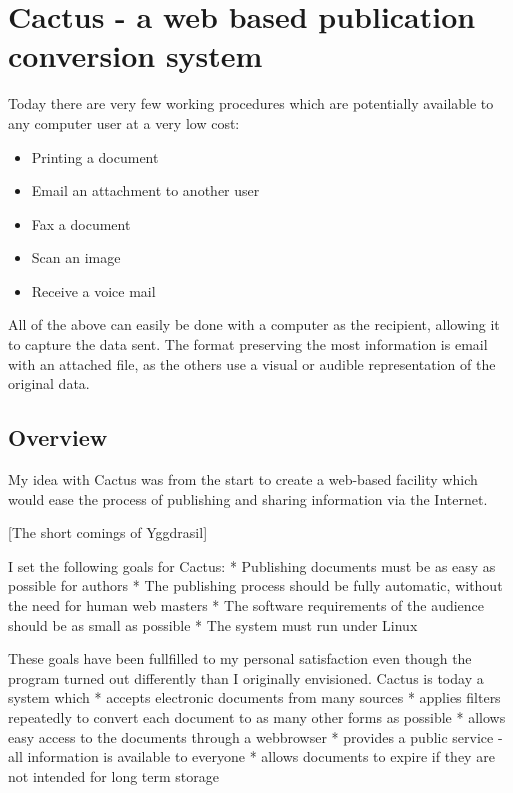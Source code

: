 



\chapter{Cactus - a web based publication conversion system}

\label{sec:cactus}
Today there are very few working procedures which are potentially
available to any computer user at a very low cost:

\begin{itemize}
\item Printing a document
\item Email an attachment to another user
\item Fax a document
\item Scan an image
\item Receive a voice mail
\end{itemize}

All of the above can easily be done with a computer as the recipient,
allowing it to capture the data sent.  The format preserving the most
information is email with an attached file, as the others use a visual
or audible representation of the original data.

\section{Overview}

   My idea with Cactus was from the start to create a web-based facility
   which would ease the process of publishing and sharing information via
   the Internet.

   [The short comings of Yggdrasil]

   I set the following goals for Cactus:
     * Publishing documents must be as easy as possible for authors
     * The publishing process should be fully automatic, without the need
       for human web masters
     * The software requirements of the audience should be as small as
       possible
     * The system must run under Linux

   These goals have been fullfilled to my personal satisfaction even
   though the program turned out differently than I originally
   envisioned. Cactus is today a system which
     * accepts electronic documents from many sources
     * applies filters repeatedly to convert each document to as many
       other forms as possible
     * allows easy access to the documents through a webbrowser
     * provides a public service - all information is available to
       everyone
     * allows documents to expire if they are not intended for long term
       storage


